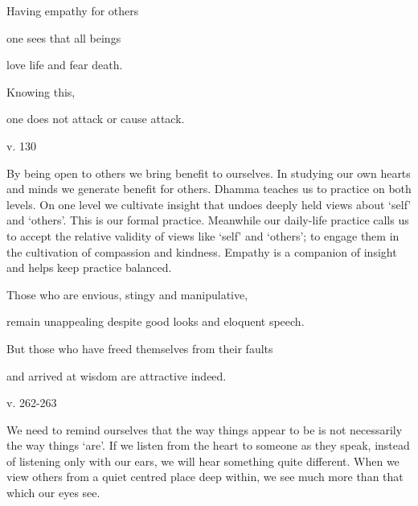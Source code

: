 \documentclass[a4paper,portrait,12pt]{article}
\begin{document}
Having empathy for others


one sees that all beings


love life and fear death.


Knowing this,


one does not attack or cause attack.





v. 130





By being open to others we bring benefit to ourselves. In studying our own hearts and minds we generate benefit for others. Dhamma teaches us to practice on both levels. On one level we cultivate insight that undoes deeply held views about `self' and `others'. This is our formal practice. Meanwhile our daily-life practice calls us to accept the relative validity of views like `self' and `others'; to engage them in the cultivation of compassion and kindness. Empathy is a companion of insight and helps keep practice balanced.














Those who are envious, stingy and manipulative,


remain unappealing despite good looks and eloquent speech.


But those who have freed themselves from their faults 


and arrived at wisdom are attractive indeed.





v. 262-263





We need to remind ourselves that the way things appear to be is not necessarily the way things `are'. If we listen from the heart to someone as they speak, instead of listening only with our ears, we will hear something quite different. When we view others from a quiet centred place deep within, we see much more than that which our eyes see.
\end{document}
